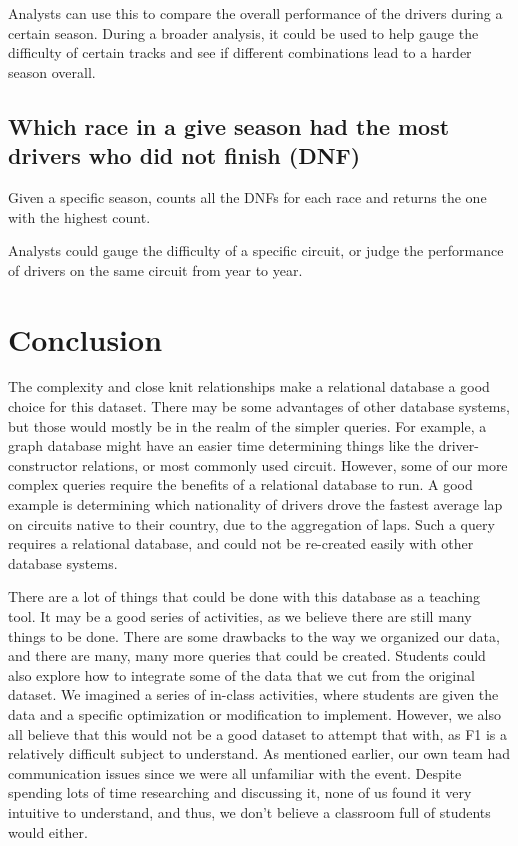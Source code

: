 \documentclass[]{article}
\begin{document}
Analysts can use this to compare the overall performance of the drivers during a certain season. During a broader analysis, it could be used to help gauge the difficulty of certain tracks and see if different combinations lead to a harder season overall.

\subsection{Which race in a give season had the most drivers who did not finish (DNF)}
Given a specific season, counts all the DNFs for each race and returns the one with the highest count. 

Analysts could gauge the difficulty of a specific circuit, or judge the performance of drivers on the same circuit from year to year. 

\section{Conclusion}

The complexity and close knit relationships make a relational database a good choice for this dataset. There may be some advantages of other database systems, but those would mostly be in the realm of the simpler queries. For example, a graph database might have an easier time determining things like the driver-constructor relations, or most commonly used circuit. However, some of our more complex queries require the benefits of a relational database to run. A good example is determining which nationality of drivers drove the fastest average lap on circuits native to their country, due to the aggregation of laps. Such a query requires a relational database, and could not be re-created easily with other database systems. 

There are a lot of things that could be done with this database as a teaching tool. It may be a good series of activities, as we believe there are still many things to be done. There are some drawbacks to the way we organized our data, and there are many, many more queries that could be created. Students could also explore how to integrate some of the data that we cut from the original dataset. We imagined a series of in-class activities, where students are given the data and a specific optimization or modification to implement. However, we also all believe that this would not be a good dataset to attempt that with, as F1 is a relatively difficult subject to understand. As mentioned earlier, our own team had communication issues since we were all unfamiliar with the event. Despite spending lots of time researching and discussing it, none of us found it very intuitive to understand, and thus, we don't believe a classroom full of students would either. 
\end{document}
